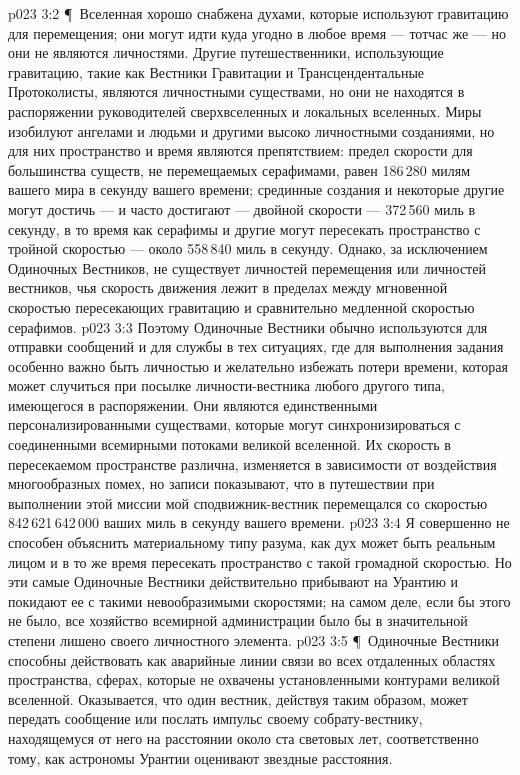 \vs p023 3:2 \P\ Вселенная хорошо снабжена духами, которые используют гравитацию для перемещения; они могут идти куда угодно в любое время --- тотчас же --- но они не являются личностями. Другие путешественники, использующие гравитацию, такие как Вестники Гравитации и Трансцендентальные Протоколисты, являются личностными существами, но они не находятся в распоряжении руководителей сверхвселенных и локальных вселенных. Миры изобилуют ангелами и людьми и другими высоко личностными созданиями, но для них пространство и время являются препятствием: предел скорости для большинства существ, не перемещаемых серафимами, равен 186\,280 милям вашего мира в секунду вашего времени; срединные создания и некоторые другие могут достичь --- и часто достигают --- двойной скорости --- 372\,560 миль в секунду, в то время как серафимы и другие могут пересекать пространство с тройной скоростью --- около 558\,840 миль в секунду. Однако, за исключением Одиночных Вестников, не существует личностей перемещения или личностей вестников, чья скорость движения лежит в пределах между мгновенной скоростью пересекающих гравитацию и сравнительно медленной скоростью серафимов.
\vs p023 3:3 Поэтому Одиночные Вестники обычно используются для отправки сообщений и для службы в тех ситуациях, где для выполнения задания особенно важно быть личностью и желательно избежать потери времени, которая может случиться при посылке личности\hyp{}вестника любого другого типа, имеющегося в распоряжении. Они являются единственными персонализированными существами, которые могут синхронизироваться с соединенными всемирными потоками великой вселенной. Их скорость в пересекаемом пространстве различна, изменяется в зависимости от воздействия многообразных помех, но записи показывают, что в путешествии при выполнении этой миссии мой сподвижник\hyp{}вестник перемещался со скоростью 842\,621\,642\,000 ваших миль в секунду вашего времени.
\vs p023 3:4 Я совершенно не способен объяснить материальному типу разума, как дух может быть реальным лицом и в то же время пересекать пространство с такой громадной скоростью. Но эти самые Одиночные Вестники действительно прибывают на Урантию и покидают ее с такими невообразимыми скоростями; на самом деле, если бы этого не было, все хозяйство всемирной администрации было бы в значительной степени лишено своего личностного элемента.
\vs p023 3:5 \P\ Одиночные Вестники способны действовать как аварийные линии связи во всех отдаленных областях пространства, сферах, которые не охвачены установленными контурами великой вселенной. Оказывается, что один вестник, действуя таким образом, может передать сообщение или послать импульс своему собрату\hyp{}вестнику, находящемуся от него на расстоянии около ста световых лет, соответственно тому, как астрономы Урантии оценивают звездные расстояния.
